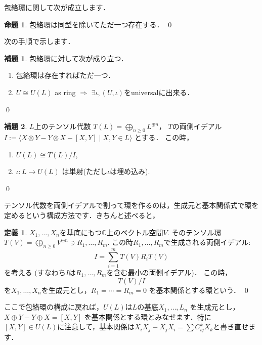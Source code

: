 \documentclass[dvipdfmx,autodetect-engine]{article}
\theoremstyle{definition}
\newtheorem{Def}{定義}
\newtheorem{Prop}{命題}
\newtheorem{Lem}{補題}
\begin{document}
    包絡環に関して次が成立します．
    \begin{Prop}
        包絡環は同型を除いてただ一つ存在する．
        \qed
    \end{Prop}
    
    次の手順で示します．
    \begin{Lem}
        包絡環に対して次が成り立つ．
        \begin{enumerate}
            \item 包絡環は存在すればただ一つ．
            \item $U \cong U(L)$ as ring $\Rightarrow$ $\exists \iota, (U, \iota)$をuniversalに出来る．
        \end{enumerate}
        \qed
    \end{Lem}
    
    \begin{Lem}
        $L$上のテンソル代数 $T(L) = \bigoplus_{n \geq 0}L^{\oplus n}$，
        $T$の両側イデアル $I := \langle X \otimes Y - Y \otimes X - [X, Y] \mid X, Y \in L \rangle$
        とする．
        この時，
        \begin{enumerate}
            \item $U(L) \cong T(L)/I$,
            \item $\iota: L \to U(L)$ は単射(ただし$\iota$は埋め込み).
        \end{enumerate}
        \qed
    \end{Lem}
    
    テンソル代数を両側イデアルで割って環を作るのは，生成元と基本関係式で環を定めるという構成方法です．きちんと述べると，
    \begin{Def}
        $X_1, \dots, X_n$を基底にもつ$\mathbb{C}$上のベクトル空間$V$. 
        そのテンソル環$T(V) = \bigoplus_{n \geq 0}V^{\oplus n} \ni R_1, \dots, R_m$.
        この時$R_1, \dots, R_m$で生成される両側イデアル: 
        \[
            I = \sum_{i = 1}^{m}T(V)R_iT(V)
        \]
        を考える (すなわち$I$は$R_1, \dots, R_m$を含む最小の両側イデアル)．
        この時，
        \[
            T(V)/I
        \]
        を$X_1, \dots, X_n$を生成元とし，$R_1 = \cdots = R_m = 0$ を基本関係とする環という．
        \qed
    \end{Def}
    
    ここで包絡環の構成に戻れば，$U(L)$は$L$の基底$X_1, \dots, L_n$ を生成元とし，$X \oplus Y - Y \oplus X = [X, Y]$ を基本関係とする環とみなせます．特に$[X, Y] \in U(L)$に注意して，基本関係は$X_iX_j - X_jX_i = \sum C_{ij}^k X_k$と書き直せます．
    
\end{document}
